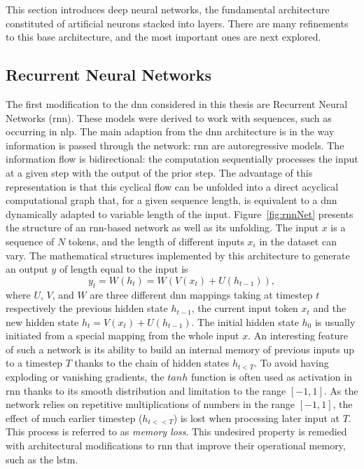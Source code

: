 This section introduces deep neural networks, the fundamental architecture constituted of artificial neurons stacked into layers. There are many refinements to this base architecture, and the most important ones are next explored. 

\subsection{Recurrent Neural Networks}\label{sec:RNN}
The first modification to the \gls{dnn} considered in this thesis are Recurrent Neural Networks (\gls{rnn}). These models were derived to work with sequences, such as occurring in \gls{nlp}. The main adaption from the \gls{dnn} architecture is in the way information is passed through the network: \gls{rnn} are autoregressive models. The information flow is bidirectional: the computation sequentially processes the input at a given step with the output of the prior step. The advantage of this representation is that this cyclical flow can be unfolded into a direct acyclical computational graph that, for a given sequence length, is equivalent to a \gls{dnn} dynamically adapted to variable length of the input. Figure~\ref{fig:rnnNet} presents the structure of an \gls{rnn}-based network as well as its unfolding. The input $x$ is a sequence of $N$ tokens, and the length of different inputs $x_i$ in the dataset can vary. The mathematical structures implemented by this architecture to generate an output $y$ of length equal to the input is
\begin{equation}\label{eq:rnnModel}
    y_t = W(h_t) = W(V(x_t) + U(h_{t-1})),
\end{equation}
where $U$, $V$, and $W$ are three different \gls{dnn} mappings taking at timestep $t$ respectively the previous hidden state $h_{t-1}$, the current input token $x_t$ and the new hidden state $h_t = V(x_t) + U(h_{t-1})$. The initial hidden state $h_0$ is usually initiated from a special mapping from the whole input $x$. An interesting feature of such a network is its ability to build an internal memory of previous inputs up to a timestep $T$ thanks to the chain of hidden states $h_{t<T}$. To avoid having exploding or vanishing gradients, the $tanh$ function is often used as activation in \gls{rnn} thanks to its smooth distribution and limitation to the range $[-1, 1]$. As the network relies on repetitive multiplications of numbers in the range $[-1, 1]$, the effect of much earlier timestep ($h_{t<<T}$) is lost when processing later input at $T$. This process is referred to as \textit{memory loss}. This undesired property is remedied with architectural modifications to \gls{rnn} that improve their operational memory, such as the \gls{lstm}.%

